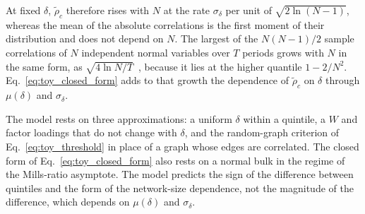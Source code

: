 \documentclass[a4paper,fleqn]{cas-sc}
\begin{document}
At fixed $\delta$, $\tilde\rho_c$ therefore rises with $N$ at the rate $\sigma_\delta$ per unit of $\sqrt{2 \ln(N - 1)}$, whereas the mean of the absolute correlations is the first moment of their distribution and does not depend on $N$. The largest of the $N(N-1)/2$ sample correlations of $N$ independent normal variables over $T$ periods grows with $N$ in the same form, as $\sqrt{4 \ln N / T}$~\citep{jiang2004largest}, because it lies at the higher quantile $1 - 2/N^2$. Eq.~\eqref{eq:toy_closed_form} adds to that growth the dependence of $\tilde\rho_c$ on $\delta$ through $\mu(\delta)$ and $\sigma_\delta$.

The model rests on three approximations: a uniform $\delta$ within a quintile, a $W$ and factor loadings that do not change with $\delta$, and the random-graph criterion of Eq.~\eqref{eq:toy_threshold} in place of a graph whose edges are correlated. The closed form of Eq.~\eqref{eq:toy_closed_form} also rests on a normal bulk in the regime of the Mills-ratio asymptote. The model predicts the sign of the difference between quintiles and the form of the network-size dependence, not the magnitude of the difference, which depends on $\mu(\delta)$ and $\sigma_\delta$.
\end{document}
